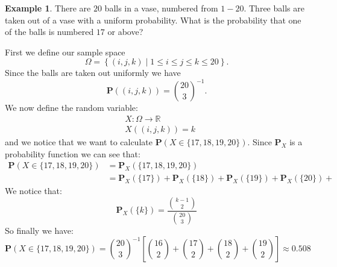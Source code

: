 \documentclass[11pt,a4paper]{article}
\theoremstyle{definition}
\newtheorem{example}{Example}[section]
\theoremstyle{plain}
\newcommand{\R}{\mathbb{R}}
\newcommand{\Prob}{\mathbf{P}}
\newcommand{\set}[2]{ \left\{ #1 \mid #2 \right\} }
\begin{document}
  \begin{example}
    There are $20$ balls in a vase, numbered from $1-20$.
    Three balls are taken out of a vase with a uniform probability.
    What is the probability that one of the balls is numbered $17$ or above?

    First we define our sample space
    \[
      \Omega = \set{(i,j,k)}{1 \le i \le j \le k \le 20}.
    \]
    Since the balls are taken out uniformly we have 
    \[ \Prob\left((i,j,k)\right) = {\binom{20}{3}}^{-1}. \]
    We now define the random variable:
    \begin{align*}
      &X \colon \Omega \to \R \\
      &X\left((i,j,k)\right) = k
    \end{align*}
    and we notice that we want to calculate 
    $\Prob\left(X \in \{17,18,19,20\}\right)$.
    Since $\Prob_X$ is a probability function we can see that:
    \begin{align*}
      \Prob\left(X \in \{17,18,19,20\}\right) &= 
      \Prob_X\left(\{17,18,19,20\}\right) \\ &=
      \Prob_X\left(\{17\}\right) + 
      \Prob_X\left(\{18\}\right) +
      \Prob_X\left(\{19\}\right) +
      \Prob_X\left(\{20\}\right) +
    \end{align*}
    We notice that:
    \[
      \Prob_X\left(\{k\}\right) = \frac{\binom{k-1}{2}}{\binom{20}{3}}
    \]
    So finally we have:
    \[
      \Prob\left(X \in \{17,18,19,20\}\right) = 
      {\binom{20}{3}}^{-1} 
      \left[
        \binom{16}{2} + \binom{17}{2} + \binom{18}{2} + \binom{19}{2}
      \right]
      \approx 0.508
    \]
  \end{example}
\end{document}
